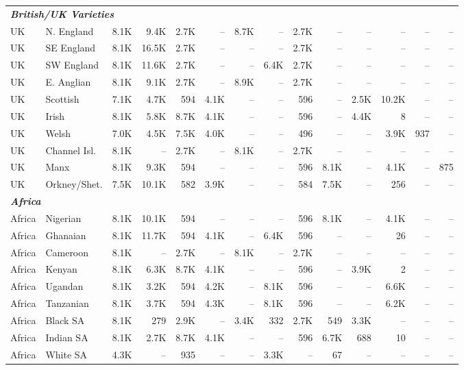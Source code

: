 \begin{table}[t]
{\begin{tabular}{llrrrrrrrrrrrr}
\midrule
\multicolumn{14}{l}{\textit{\textbf{British/UK Varieties}}} \\
UK & N. England & 8.1K & 9.4K & 2.7K & -- & 8.7K & -- & 2.7K & -- & -- & -- & -- & -- \\
UK & SE England & 8.1K & 16.5K & 2.7K & -- & -- & -- & 2.7K & -- & -- & -- & -- & -- \\
UK & SW England & 8.1K & 11.6K & 2.7K & -- & -- & 6.4K & 2.7K & -- & -- & -- & -- & -- \\
UK & E. Anglian & 8.1K & 9.1K & 2.7K & -- & 8.9K & -- & 2.7K & -- & -- & -- & -- & -- \\
UK & Scottish & 7.1K & 4.7K & 594 & 4.1K & -- & -- & 596 & -- & 2.5K & 10.2K & -- & -- \\
UK & Irish & 8.1K & 5.8K & 8.7K & 4.1K & -- & -- & 596 & -- & 4.4K & 8 & -- & -- \\
UK & Welsh & 7.0K & 4.5K & 7.5K & 4.0K & -- & -- & 496 & -- & -- & 3.9K & 937 & -- \\
UK & Channel Isl. & 8.1K & -- & 2.7K & -- & 8.1K & -- & 2.7K & -- & -- & -- & -- & -- \\
UK & Manx & 8.1K & 9.3K & 594 & -- & -- & -- & 596 & 8.1K & -- & 4.1K & -- & 875 \\
UK & Orkney/Shet. & 7.5K & 10.1K & 582 & 3.9K & -- & -- & 584 & 7.5K & -- & 256 & -- & -- \\
\midrule
\multicolumn{14}{l}{\textit{\textbf{Africa}}} \\
Africa & Nigerian & 8.1K & 10.1K & 594 & -- & -- & -- & 596 & 8.1K & -- & 4.1K & -- & -- \\
Africa & Ghanaian & 8.1K & 11.7K & 594 & 4.1K & -- & 6.4K & 596 & -- & -- & 26 & -- & -- \\
Africa & Cameroon & 8.1K & -- & 2.7K & -- & 8.1K & -- & 2.7K & -- & -- & -- & -- & -- \\
Africa & Kenyan & 8.1K & 6.3K & 8.7K & 4.1K & -- & -- & 596 & -- & 3.9K & 2 & -- & -- \\
Africa & Ugandan & 8.1K & 3.2K & 594 & 4.2K & -- & 8.1K & 596 & -- & -- & 6.6K & -- & -- \\
Africa & Tanzanian & 8.1K & 3.7K & 594 & 4.3K & -- & 8.1K & 596 & -- & -- & 6.2K & -- & -- \\
Africa & Black SA & 8.1K & 279 & 2.9K & -- & 3.4K & 332 & 2.7K & 549 & 3.3K & -- & -- & -- \\
Africa & Indian SA & 8.1K & 2.7K & 8.7K & 4.1K & -- & -- & 596 & 6.7K & 688 & 10 & -- & -- \\
Africa & White SA & 4.3K & -- & 935 & -- & -- & 3.3K & -- & 67 & -- & -- & -- & -- \\

\end{tabular}}
\end{table}
